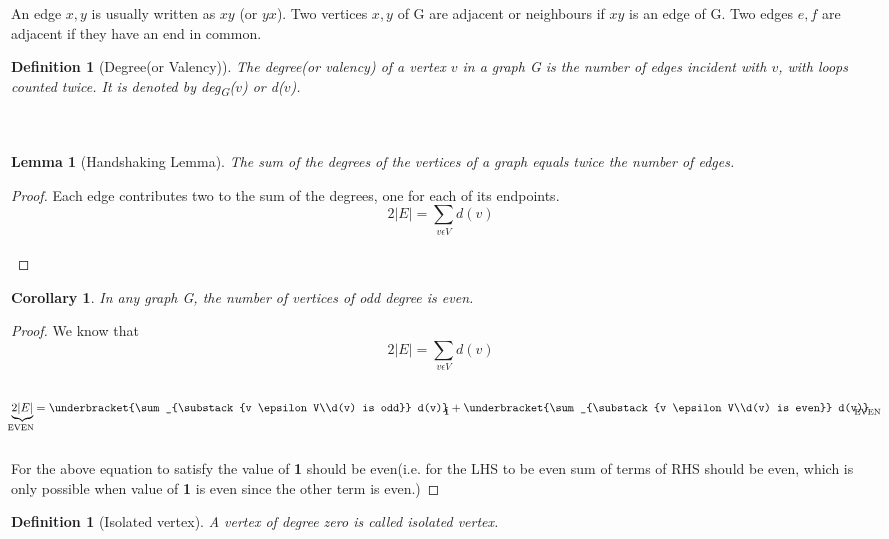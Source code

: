 \documentclass{article}
\newtheorem{lemma}[theorem]{Lemma}
\newtheorem{corollary}[theorem]{Corollary}
\newtheorem{definition}[theorem]{Definition}
\begin{document}
\quad An edge ${x,y}$ is usually written as $xy$ (or $yx$). 
Two vertices ${x,y}$ of G are adjacent or neighbours if $xy$ is an edge of G. 
Two edges $e,f$ are adjacent if they have an end in common.

\begin{definition}[Degree(or Valency)]
\quad The \emph{degree(or valency)} of a vertex $v$ in a graph G is the number of edges incident with $v$, 
with loops counted twice. It is denoted by deg\textsubscript{G}($v$) or d($v$).\\~\\~\\
\end{definition}

\begin{lemma}[Handshaking Lemma]
The sum of the degrees of the vertices of a graph equals twice the number of edges.
\end{lemma}

\begin{proof}
Each edge contributes two to the sum of the degrees, one for each of its endpoints.
$$ 2|E| = \sum_{v \epsilon V} d(v)$$\\
\end{proof}

\begin{corollary}
In any graph G, the number of vertices of odd degree is even.
\end{corollary}

\begin{proof}
We know that
$$ 2|E| = \sum_{v \epsilon V} d(v)$$\\
$$ \underbrace{2|E|}_\text{\clap{EVEN~}} = 
\underbracket{\sum_{\substack{v \epsilon V\\d(v) is odd}} d(v)}_\text{\clap{\textbf{1~}}} 
+ \underbracket{\sum_{\substack{v \epsilon V\\d(v) is even}} d(v)}_\text{\clap{EVEN~}} $$\\
\quad For the above equation to satisfy the value of \textbf{1} should be even(i.e. for the LHS 
to be even sum of terms of RHS should be even, which is only possible when value of \textbf{1}
is even since the other term is even.)
\end{proof}

\begin{definition}[Isolated vertex]
\quad A vertex of degree zero is called isolated vertex.\\
\end{definition}
\end{document}
